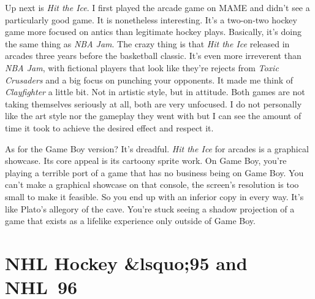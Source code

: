 \documentclass{book}
\let\oldcenter\center
\let\oldendcenter\endcenter
\renewenvironment{center}{\setlength\topsep{0pt}\oldcenter}{\oldendcenter}
\begin{document}
\begin{center}
\quad\vspace{4pt}
\quad\vspace{4pt}
\end{center}

Up next is \emph{Hit the Ice}. I first played the arcade game on MAME and didn’t see a particularly good game. It is nonetheless interesting. It’s a two-on-two hockey game more focused on antics than legitimate hockey plays. Basically, it’s doing the same thing as \emph{NBA Jam}. The crazy thing is that \emph{Hit the Ice} released in arcades three years before the basketball classic. It’s even more irreverent than \emph{NBA Jam}, with fictional players that look like they’re rejects from \emph{Toxic Crusaders} and a big focus on punching your opponents. It made me think of \emph{Clayfighter} a little bit. Not in artistic style, but in attitude. Both games are not taking themselves seriously at all, both are very unfocused. I do not personally like the art style nor the gameplay they went with but I can see the amount of time it took to achieve the desired effect and respect it.

As for the Game Boy version? It’s dreadful. \emph{Hit the Ice} for arcades is a graphical showcase. Its core appeal is its cartoony sprite work. On Game Boy, you’re playing a terrible port of a game that has no business being on Game Boy. You can’t make a graphical showcase on that console, the screen’s resolution is too small to make it feasible. So you end up with an inferior copy in every way. It’s like Plato’s allegory of the cave. You’re stuck seeing a shadow projection of a game that exists as a lifelike experience only outside of Game Boy.

\FloatBarrier\needspace{10mm}\section*{NHL Hockey &lsquo;95 and NHL~96}\nopagebreak[4]

\begin{center}
\quad\vspace{4pt}
\quad\vspace{4pt}
\quad\vspace{4pt}
\quad\vspace{4pt}
\end{center}
\end{document}

